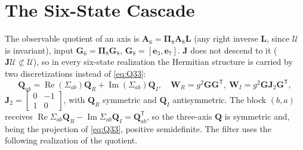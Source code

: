 \documentclass[conference]{IEEEtran}
\DeclareRobustCommand{\vct}[1]{\bm{#1}}
\DeclareRobustCommand{\mat}[1]{\bm{#1}}
\newcommand{\T}{^{\mathsf T}}
\renewcommand{\Re}{\operatorname{Re}}
\renewcommand{\Im}{\operatorname{Im}}
\theoremstyle{bodysmall}
\begin{document}
\section{The Six-State Cascade}
The observable quotient of an axis is $\mat A_6=\mat\Pi_8\mat A_8\mat L$
(any right inverse $\mat L$, since $\mathcal U$ is invariant), input
$\mat G_6=\mat\Pi_8\mat G_8$, $\mat G_8=[\vct e_3,\vct e_7]$. $\mat J$ does not
descend to it ($\mat J\mathcal U\not\subset\mathcal U$), so in every six-state
realization the Hermitian structure is carried by two discretizations
instead of \eqref{eq:Q33}:
\begin{equation}
\mat Q_{ab}=\Re(\Sigma_{ab})\mat Q_R+\Im(\Sigma_{ab})\mat Q_I,\quad
\mat W_R=g^2\mat G\mat G\T,\ \mat W_I=g^2\mat G\mat J_2\mat G\T,
\label{eq:Q27}
\end{equation}
$\mat J_2=\left[\begin{smallmatrix}0&-1\\1&0\end{smallmatrix}\right]$, with
$\mat Q_R$ symmetric and $\mat Q_I$ antisymmetric. The block $(b,a)$ receives
$\Re\Sigma_{ab}\mat Q_R-\Im\Sigma_{ab}\mat Q_I=\mat Q_{ab}\T$, so the
three-axis $\mat Q$ is symmetric and, being the projection of
\eqref{eq:Q33}, positive semidefinite. The filter uses the following
realization of the quotient.
\end{document}
